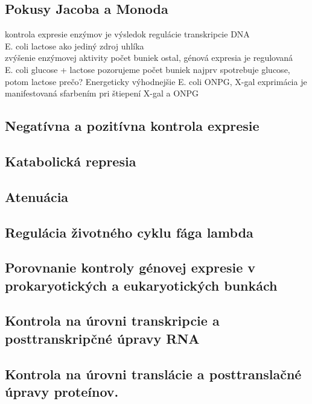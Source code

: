 \subsection{Pokusy Jacoba a Monoda}
kontrola expresie enzýmov je výsledok regulácie transkripcie DNA\\

E. coli \ra lactose ako jediný zdroj uhlíka\\
\tab zvýšenie enzýmovej aktivity \la počet buniek ostal, génová expresia je regulovaná\\
E. coli \ra glucose + lactose
\tab pozorujeme počet buniek
\tab najprv spotrebuje glucose, potom lactose
\tab prečo? Energeticky výhodnejšie
E. coli \ra ONPG, X-gal
\tab exprimácia je manifestovaná sfarbením pri štiepení X-gal a ONPG

\subsection{Negatívna a pozitívna kontrola expresie}

\subsection{Katabolická represia}

\subsection{Atenuácia}

\subsection{Regulácia životného cyklu fága lambda}

\subsection{Porovnanie kontroly génovej expresie v prokaryotických a eukaryotických bunkách}

\subsection{Kontrola na úrovni transkripcie a posttranskripčné úpravy RNA}

\subsection{Kontrola na úrovni translácie a posttranslačné úpravy proteínov.}


